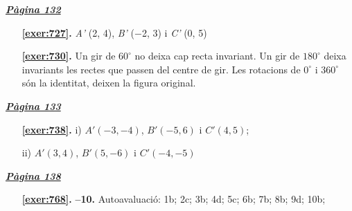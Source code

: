 
\hyperlink{page.132}{\textbf{\em Pàgina 132}}
\begin{enumerate}
\item[\fontfamily{phv}\selectfont\color{blue}\textbf{\ref{exer:727}. }] \label{ans:727} 
\textit {A'} (2, 4), \textit {B'} ($-$2, 3) i \textit {C'} (0, 5)
 \end{enumerate}
\begin{enumerate}
\item[\fontfamily{phv}\selectfont\color{blue}\textbf{\ref{exer:730}. }] \label{ans:730} 
 Un gir de $60^\circ $ no deixa cap recta invariant. Un gir de $180^\circ $ deixa invariants les rectes que passen del centre de gir. Les rotacions de $0^\circ $ i $360^\circ $ són la identitat, deixen la figura original. 
 \end{enumerate}
\vspace{0.3cm}


\hyperlink{page.133}{\textbf{\em Pàgina 133}}
\begin{enumerate}
\item[\fontfamily{phv}\selectfont\color{blue}\textbf{\ref{exer:738}. }] \label{ans:738} 
i) $A'(-3,-4)$, $B'(-5,6)$ i $C'(4,5)$;\par ii) $A'(3,4)$, $B'(5,-6)$ i $C'(-4,-5)$
 \end{enumerate}
\vspace{0.3cm}


\hyperlink{page.138}{\textbf{\em Pàgina 138}}
\begin{enumerate}
\item[\fontfamily{phv}\selectfont\color{blue}\textbf{\ref{exer:768}. }] \label{ans:768} 
\textbf {--10. } Autoavaluació: 1b; 2c; 3b; 4d; 5c; 6b; 7b; 8b; 9d; 10b;
 \end{enumerate}

 \vspace{1cm} 
 

\vspace{0.3cm}


